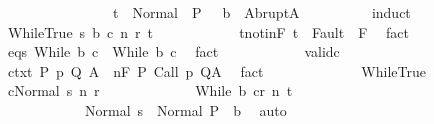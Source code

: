 \begin{isabellebody}
\ \ \ \ \ \ \ \ \ \ \ \ \ \ \ {\isasymLongrightarrow}\ t\ {\isasymin}\ Normal\ {\isacharbackquote}\ {\isacharparenleft}P\ {\isasyminter}\ {\isacharminus}\ b{\isacharparenright}\ {\isasymunion}\ Abrupt{\isacharbackquote}A{\isachardoublequoteclose}\isanewline
\ \ \ \ \ \ \ \ \isamarkupfalse%
\ {\isacharparenleft}induct{\isacharparenright}\isanewline
\ \ \ \ \ \ \ \ \ \ \isamarkupfalse%
\ {\isacharparenleft}WhileTrue\ s\ b{\isacharprime}\ c{\isacharprime}\ n\ r\ t{\isacharparenright}\isanewline
\ \ \ \ \ \ \ \ \ \ \isamarkupfalse%
\ t{\isacharunderscore}notin{\isacharunderscore}F{\isacharcolon}\ {\isachardoublequoteopen}t\ {\isasymnotin}\ Fault\ {\isacharbackquote}\ F{\isachardoublequoteclose}\ \isamarkupfalse%
\ fact\isanewline
\ \ \ \ \ \ \ \ \ \ \isamarkupfalse%
\ eqs{\isacharcolon}\ {\isachardoublequoteopen}While\ b{\isacharprime}\ c{\isacharprime}\ {\isacharequal}\ While\ b\ c{\isachardoublequoteclose}\ \isamarkupfalse%
\ fact\isanewline
\ \ \ \ \ \ \ \ \ \ \isamarkupfalse%
\ valid{\isacharunderscore}c\isanewline
\ \ \ \ \ \ \ \ \ \ \isamarkupfalse%
\ \isamarkupfalse%
\ ctxt{\isacharcolon}\ {\isachardoublequoteopen}{\isasymforall}{\isacharparenleft}P{\isacharcomma}\ p{\isacharcomma}\ Q{\isacharcomma}\ A{\isacharparenright}{\isasymin}{\isasymTheta}{\isachardot}\ {\isasymGamma}\ {\isasymTurnstile}n{\isacharcolon}\isactrlbsub {\isacharslash}F\isactrlesub \ P\ {\isacharparenleft}Call\ p{\isacharparenright}\ Q{\isacharcomma}A{\isachardoublequoteclose}\ \isamarkupfalse%
\ fact\isanewline
\ \ \ \ \ \ \ \ \ \ \isamarkupfalse%
\ \isamarkupfalse%
\ WhileTrue\isanewline
\ \ \ \ \ \ \ \ \ \ \isamarkupfalse%
\ {\isachardoublequoteopen}{\isasymGamma}{\isasymturnstile}{\isasymlangle}c{\isacharcomma}Normal\ s{\isasymrangle}\ {\isacharequal}n{\isasymRightarrow}\ r{\isachardoublequoteclose}\ \isanewline
\ \ \ \ \ \ \ \ \ \ \ \ {\isachardoublequoteopen}{\isasymGamma}{\isasymturnstile}{\isasymlangle}While\ b\ c{\isacharcomma}r{\isasymrangle}\ {\isacharequal}n{\isasymRightarrow}\ t{\isachardoublequoteclose}\ \isanewline
\ \ \ \ \ \ \ \ \ \ \ \ {\isachardoublequoteopen}Normal\ s\ {\isasymin}\ Normal\ {\isacharbackquote}{\isacharparenleft}P\ {\isasyminter}\ b{\isacharparenright}{\isachardoublequoteclose}\ \isamarkupfalse%
\ auto\isanewline
\ \ \ \ \ \ \ \ \ \ \isamarkupfalse%
\ \isamarkupfalse%

\end{isabellebody}
